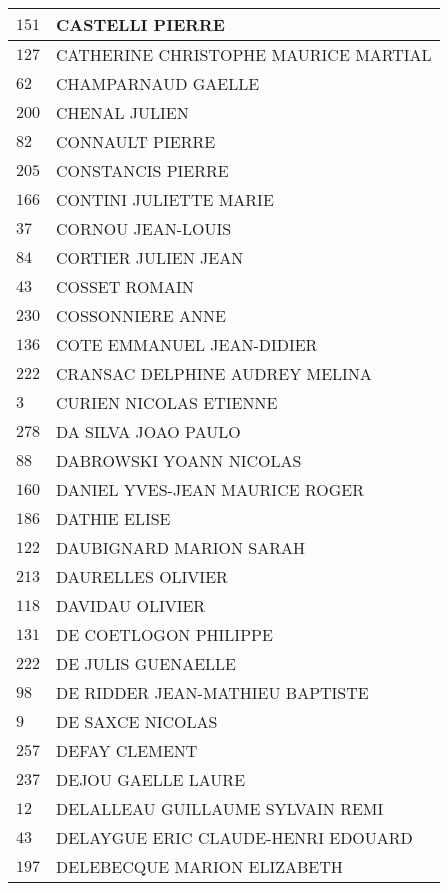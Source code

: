\begin{xltabular}{\linewidth}{|l|X|}
    \hline
    $151$ & CASTELLI PIERRE \\
    \hline
    $127$ & CATHERINE CHRISTOPHE MAURICE MARTIAL \\
    \hline
    $62$ & CHAMPARNAUD GAELLE \\
    \hline
    $200$ & CHENAL JULIEN \\
    \hline
    $82$ & CONNAULT PIERRE \\
    \hline
    $205$ & CONSTANCIS PIERRE \\
    \hline
    $166$ & CONTINI JULIETTE MARIE \\
    \hline
    $37$ & CORNOU JEAN-LOUIS \\
    \hline
    $84$ & CORTIER JULIEN JEAN \\
    \hline
    $43$ & COSSET ROMAIN \\
    \hline
    $230$ & COSSONNIERE ANNE \\
    \hline
    $136$ & COTE EMMANUEL JEAN-DIDIER \\
    \hline
    $222$ & CRANSAC DELPHINE AUDREY MELINA \\
    \hline
    $3$ & CURIEN NICOLAS ETIENNE \\
    \hline
    $278$ & DA SILVA JOAO PAULO \\
    \hline
    $88$ & DABROWSKI YOANN NICOLAS \\
    \hline
    $160$ & DANIEL YVES-JEAN MAURICE ROGER \\
    \hline
    $186$ & DATHIE ELISE \\
    \hline
    $122$ & DAUBIGNARD MARION SARAH \\
    \hline
    $213$ & DAURELLES OLIVIER \\
    \hline
    $118$ & DAVIDAU OLIVIER \\
    \hline
    $131$ & DE COETLOGON PHILIPPE \\
    \hline
    $222$ & DE JULIS GUENAELLE \\
    \hline
    $98$ & DE RIDDER JEAN-MATHIEU BAPTISTE \\
    \hline
    $9$ & DE SAXCE NICOLAS \\
    \hline
    $257$ & DEFAY CLEMENT \\
    \hline
    $237$ & DEJOU GAELLE LAURE \\
    \hline
    $12$ & DELALLEAU GUILLAUME SYLVAIN REMI \\
    \hline
    $43$ & DELAYGUE ERIC CLAUDE-HENRI EDOUARD \\
    \hline
    $197$ & DELEBECQUE MARION ELIZABETH \\

\end{xltabular}
